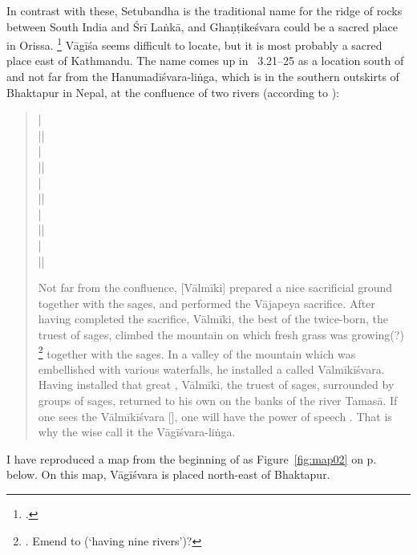 In contrast with these, Setubandha is the
traditional name for the ridge of rocks between
South India and Śrī Laṅkā, and Ghaṇṭikeśvara could
be a sacred place in Orissa.%
	\footnote{.}
Vāgīśa seems difficult to locate, but it is most probably
a sacred place east of Kathmandu. The name comes
up in \NepMah\ 3.21--25 as a location south of and 
not far from the Hanumadīśvara-liṅga,
which is in the southern outskirts of 
Bhaktapur in Nepal, at the confluence
of two rivers (according to 
):

\begin{quote}
 |\\
 ||\\
 |\\
 ||\\
 |\\
 ||\\
 |\\
 ||\\
 |\\
 ||

Not far from the confluence, [Vālmīki] prepared a nice
sacrificial ground together with the sages, and 
performed the Vājapeya sacrifice. After having
completed the sacrifice, Vālmīki, the best of
the twice-born, the truest of sages, climbed 
the mountain on which fresh grass was growing(?)%
	\footnote{. Emend to 
	 (`having nine rivers')?}
together with the sages. In a valley of the mountain
which was embellished with various waterfalls, he
installed a  called Vālmīkīśvara. Having 
installed that great , Vālmīki, the truest of
sages, surrounded by groups of sages,
returned to his own  on the banks
of the river Tamasā. If one sees the Vālmīkīśvara [],
one will have the power of speech . 
That is why the wise call it the Vāgīśvara-liṅga.
\end{quote}

\noindent
I have reproduced a map from the beginning of 
 as Figure~\ref{fig:map02}
on p.~\pageref{fig:map02} below. On this map, Vāgīśvara is placed north-east 
of Bhaktapur. 

